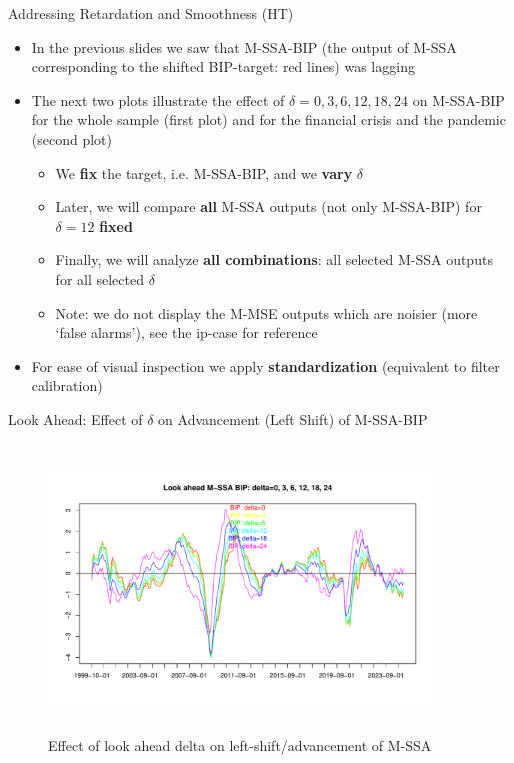 \documentclass{beamer}
\begin{document}
\begin{frame} {Addressing Retardation and Smoothness (HT)}
\begin{itemize}
\item In the previous slides we saw that M-SSA-BIP (the output of M-SSA corresponding to the shifted BIP-target: red lines) was lagging
\item The next two plots illustrate the effect of $\delta=0,3,6,12,18,24$ on M-SSA-BIP  for the whole sample (first plot) and for the financial crisis and the pandemic (second plot)
\begin{itemize}
\item We \textbf{fix} the target, i.e. M-SSA-BIP, and we \textbf{vary} $\delta$
\item Later, we will compare \textbf{all} M-SSA outputs (not only M-SSA-BIP) for  $\delta=12$ \textbf{fixed}
\item Finally, we will analyze \textbf{all combinations}: all selected M-SSA outputs for all selected $\delta$
\item Note: we do not display the M-MSE outputs which are noisier (more `false alarms'), see the ip-case for reference
\end{itemize}
\item For ease of visual inspection we apply \textbf{standardization} (equivalent to filter calibration)
\end{itemize}
\end{frame}


















\begin{frame} {Look Ahead: Effect of $\delta$ on Advancement (Left Shift) of M-SSA-BIP }
\begin{figure}[H]\begin{center}\includegraphics[height=3in, width=4in]{look_ahead_ssa_1.pdf}\caption{Effect of look ahead delta on  left-shift/advancement of M-SSA\label{cor}}\end{center}\end{figure}\end{frame}
\end{document}
